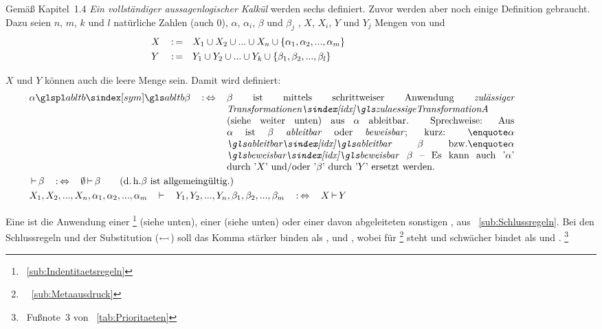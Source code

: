 Gemäß \cite{bib:Rautenberg} Kapitel~1.4 \emph{Ein vollständiger aussagenlogischer Kalkül} werden sechs  definiert. Zuvor werden aber noch einige Definition gebraucht. Dazu seien $n$, $m$, $k$ und $l$ natürliche Zahlen (auch 0), $\alpha$, $\alpha_i$, $\beta$ und $\beta_j$ , $X$, $X_i$, $Y$ und $Y_j$ Mengen von  und
\begin{align}
	&X&&\operatorname{:=}&&X_1\cup X_2\cup...\cup X_n\cup\{\alpha_1,\alpha_2,...,\alpha_m\}
	\\
	&Y&&\operatorname{:=}&&Y_1\cup Y_2\cup...\cup Y_k\cup\{\beta_1, \beta_2, ...,\beta_l \}
	&&&&&&&&&&&&&&&&&&&&
\end{align}

$X$ und $Y$ können auch die leere Menge sein. Damit wird definiert:
\begin{align}
	& \alpha \glsSym{abltb} \beta \quad \metadefeq \quad
	\parbox[t]{10.5cm}{%
	$\beta$ ist mittels schrittweiser Anwendung \emph{\glsIdxBg{zulaessigeTransformationA}{zulässiger Transformationen}} (siehe weiter unten) aus $\alpha$ ableitbar.
	Sprechweise: Aus $\alpha$ ist $\beta$ \emph{ableitbar} oder \emph{beweisbar};
	kurz: \strqt{$\alpha$ \emph{\glsIdx{ableitbar}} $\beta$} \textbzw \strqt{$\alpha$ \emph{\glsIdx{beweisbar}} $\beta$}
	-- Es kann auch \symqt{$\alpha$} durch \symqt{$X$} und/oder \symqt{$\beta$} durch \symqt{$Y$} ersetzt werden.
	}
	\label{def:ableitbar}
	\\
	& \abltb \beta \quad \metadefeq \quad \emptyset \abltb \beta \qquad \text{(\textdh $\beta$ ist allgemeingültig.)}
	\\
	&            X_1, X_2, ...,X_n, \alpha_1, \alpha_2, ..., \alpha_m \quad
	\abltb \quad Y_1, Y_2, ...,Y_n,  \beta_1,  \beta_2,  ..., \beta_m \quad
	\metadefeq \quad X \abltb Y
	\label{def:ableitbarKurz} \formulatoleft
\end{align}

Eine \emph{} ist die Anwendung einer \emph{}\footnote{\seename~\vref{sub:Indentitaetsregeln}} (siehe unten), einer \emph{} (siehe unten) oder einer davon abgeleiteten sonstigen \emph{}, \textzB aus \subsectionname~\vref{sub:Schlussregeln}.
Bei den Schlussregeln und der Substitution ($\subst$) soll das Komma stärker binden als \symqt{$\abltb$}, \symqt{$\subst$} und \symqt{$\und$}, wobei
\symqt{$\und$} für  \textbzw {}%
\footnote{\seename\ \subsectionname~\vref{sub:Metaausdruck}}
steht und schwächer bindet als \symqt{$\abltb$} und \symqt{$\subst$}.%
\footnote{\seename\ Fußnote~3 von \tablename~\vref{tab:Prioritaeten}}

